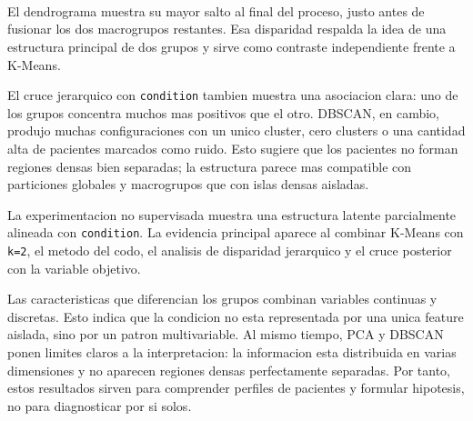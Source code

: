 \documentclass[11pt]{article}
\begin{document}
    
    \begin{center}
    \end{center}
    { \hspace*{\fill} \\}
    
    \begin{center}
    \end{center}
    { \hspace*{\fill} \\}
    
    \begin{center}
    \end{center}
    { \hspace*{\fill} \\}
    
    El dendrograma muestra su mayor salto al final del proceso, justo antes
de fusionar los dos macrogrupos restantes. Esa disparidad respalda la
idea de una estructura principal de dos grupos y sirve como contraste
independiente frente a K-Means.

El cruce jerarquico con \texttt{condition} tambien muestra una
asociacion clara: uno de los grupos concentra muchos mas positivos que
el otro. DBSCAN, en cambio, produjo muchas configuraciones con un unico
cluster, cero clusters o una cantidad alta de pacientes marcados como
ruido. Esto sugiere que los pacientes no forman regiones densas bien
separadas; la estructura parece mas compatible con particiones globales
y macrogrupos que con islas densas aisladas.

    La experimentacion no supervisada muestra una estructura latente
parcialmente alineada con \texttt{condition}. La evidencia principal
aparece al combinar K-Means con \texttt{k=2}, el metodo del codo, el
analisis de disparidad jerarquico y el cruce posterior con la variable
objetivo.

Las caracteristicas que diferencian los grupos combinan variables
continuas y discretas. Esto indica que la condicion no esta representada
por una unica feature aislada, sino por un patron multivariable. Al
mismo tiempo, PCA y DBSCAN ponen limites claros a la interpretacion: la
informacion esta distribuida en varias dimensiones y no aparecen
regiones densas perfectamente separadas. Por tanto, estos resultados
sirven para comprender perfiles de pacientes y formular hipotesis, no
para diagnosticar por si solos.
\end{document}
